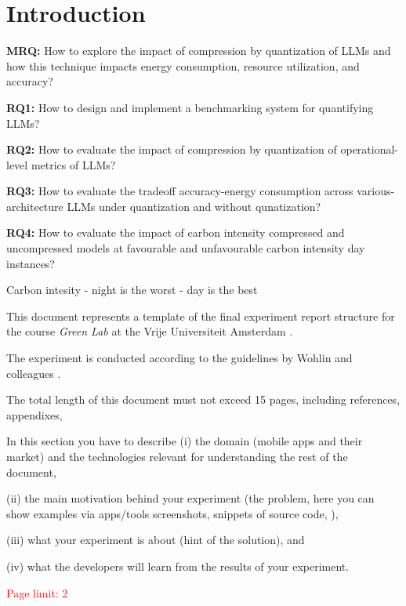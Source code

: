 \section{Introduction}

\textbf{MRQ:} How to explore the impact of compression by quantization of LLMs and how this technique impacts energy consumption, resource utilization, and accuracy?

\textbf{RQ1:} How to design and implement a benchmarking system for quantifying LLMs?

\textbf{RQ2:} How to evaluate the impact of compression by quantization of operational-level metrics of LLMs?

\textbf{RQ3:} How to evaluate the tradeoff accuracy-energy consumption across various-architecture LLMs under quantization and without qunatization?

\textbf{RQ4:} How to evaluate the impact of carbon intensity compressed and uncompressed models at favourable and unfavourable carbon intensity day instances?

Carbon intesity 
- night is the worst
- day is the best



This document represents a template of the final experiment report structure for the course \textit{Green Lab} at the Vrije Universiteit Amsterdam \cite{greenlab}.

The experiment is conducted according to the guidelines by Wohlin and colleagues \cite{wohlin12, DBLP:books/sp/WohlinRHORW24}.

The total length of this document must not exceed 15 pages, including references, appendixes, \etc

In this section you have to describe 
(i) the domain (\eg mobile apps and their market) and the technologies relevant for understanding the rest of the document, 


(ii) the main motivation behind your experiment (the problem, here you can show examples via apps/tools screenshots, snippets of source code, \etc), 

(iii) what your experiment is about (hint of the solution), and 

(iv) what the developers will learn from the results of your experiment.  

\textcolor{red}{Page limit: 2}
